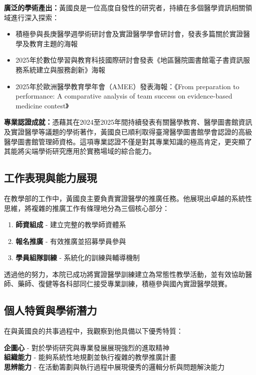 \documentclass[12pt,a4paper]{article}
\begin{document}
\textbf{廣泛的學術產出：}黃國良是一位高度自發性的研究者，持續在多個醫學資訊相關領域進行深入探索：
\begin{itemize}[leftmargin=*]
    \item 積極參與長庚醫學週學術研討會及實證醫學學會研討會，發表多篇關於實證醫學及教育主題的海報
    \item 2025年於數位學習與教育科技國際研討會發表《地區醫院圖書館電子書資訊服務系統建立與服務創新》海報
    \item 2025年於歐洲醫學教育學年會（AMEE）發表海報：《From preparation to performance: A comparative analysis of team success on evidence-based medicine contest》
\end{itemize}

\textbf{專業認證成就：}憑藉其在2024至2025年間持續發表有關醫學教育、醫學圖書館資訊及實證醫學等議題的學術著作，黃國良已順利取得臺灣醫學圖書館學會認證的高級醫學圖書館管理師資格。這項專業認證不僅是對其專業知識的極高肯定，更突顯了其能將尖端學術研究應用於實務場域的綜合能力。

\subsection*{工作表現與能力展現}

在教學部的工作中，黃國良主要負責實證醫學的推廣任務。他展現出卓越的系統性思維，將複雜的推廣工作有條理地分為三個核心部分：

\begin{enumerate}[leftmargin=*]
    \item \textbf{師資組成} - 建立完整的教學師資體系
    \item \textbf{報名推廣} - 有效推廣並招募學員參與
    \item \textbf{學員組隊訓練} - 系統化的訓練與輔導機制
\end{enumerate}

透過他的努力，本院已成功將實證醫學訓練建立為常態性教學活動，並有效協助醫師、藥師、復健等各科部同仁接受專業訓練，積極參與國內實證醫學競賽。

\subsection*{個人特質與學術潛力}

在與黃國良的共事過程中，我觀察到他具備以下優秀特質：

\textbf{企圖心} - 對於學術研究與專業發展展現強烈的進取精神 \\
\textbf{組織能力} - 能夠系統性地規劃並執行複雜的教學推廣計畫 \\
\textbf{思辨能力} - 在活動籌劃與執行過程中展現優秀的邏輯分析與問題解決能力
\end{document}
